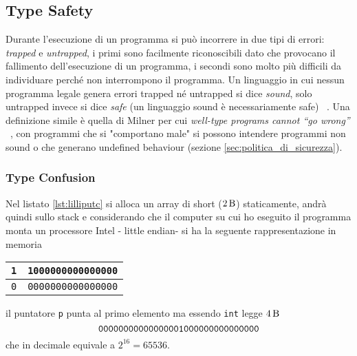 \documentclass{article}
\begin{document}



\subsection{Type Safety}
Durante l'esecuzione di un programma si può incorrere in due tipi di errori: \textit{trapped} e \textit{untrapped}, i primi sono facilmente riconoscibili dato che provocano il fallimento dell'esecuzione di un programma, i secondi sono molto più difficili da individuare perché non interrompono il programma. Un linguaggio in cui nessun programma legale genera errori trapped né untrapped si dice \textit{sound}, solo untrapped invece si dice \textit{safe} (un linguaggio sound è necessariamente safe) ~\cite{cencia:dispense}. Una definizione simile è quella di Milner per cui \textit{well-type programs cannot “go wrong”} ~\cite{milner:type_polymorphism}, con programmi che si "comportano male" si possono intendere programmi non sound o che generano undefined behaviour (sezione \ref{sec:politica_di_sicurezza}). 

\subsubsection{Type Confusion} \label{sec:type_confusion}
Nel listato \ref{lst:lilliputc} si alloca un array di short ($\SI{2}{\byte} $) staticamente, andrà quindi sullo stack e considerando che il computer su cui ho eseguito il programma monta un processore Intel - little endian- si ha la seguente rappresentazione in memoria

\begin{table}[H]
	\label{fig:mem_type_stack}
	\centering
	\begin{tabular}{|c|c|}
		\hline
		\texttt{1} & \texttt{1000000000000000} \\
		\hline 
		\texttt{0} & \texttt{0000000000000000} \\
		\hline
	\end{tabular}
\end{table}

il puntatore \texttt{p} punta al primo elemento ma essendo \texttt{int} legge $\SI{4}{\byte}$  
\[
\texttt{00000000000000001000000000000000} \\
\]
che in decimale equivale a $ 2^{16} = 65536 $.



\end{document}
